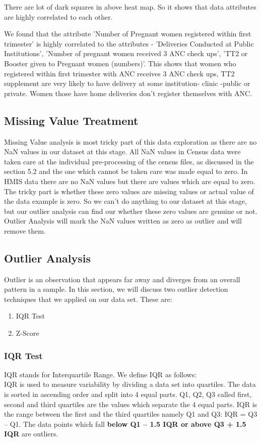 \documentclass[12pt]{article}
\begin{document}
There are lot of dark squares in above heat map. So it shows that data attributes are highly correlated to each other.

We found that the attribute 'Number of Pregnant women registered within first trimester' is highly correlated to the attributes - 'Deliveries Conducted at Public Institutions', 'Number of pregnant women received 3 ANC check ups', 'TT2 or Booster given to Pregnant women (numbers)'. This shows that women who registered within first trimester with ANC receives 3 ANC check ups, TT2 supplement are very likely to have delivery at some institution- clinic -public or private. Women those have home deliveries don't register themselves with ANC.

\subsection{Missing Value Treatment}

Missing Value analysis is most tricky part of this data exploration as there are no NaN values in our dataset at this stage. All NaN values in Census data were taken care at the individual pre-processing of the census files, as discussed in the section 5.2 and the one which cannot be taken care was made equal to zero. In HMIS data there are no NaN values but there are values which are equal to zero. \\

The tricky part is whether these zero values are missing values or actual value of the data example is zero. So we can't do anything to our dataset at this stage, but our outlier analysis can find our whether these zero values are genuine or not. Outlier Analysis will mark the NaN values written as zero as outlier and will remove them.

\subsection{Outlier Analysis}

Outlier is an observation that appears far away and diverges from an overall pattern in a sample. In this section, we will discuss two outlier detection techniques that we applied on our data set. These are:
\begin{enumerate}
	\item IQR Test
	\item Z-Score 
\end{enumerate}

\subsubsection{IQR Test}
IQR stands for Interquartile Range. We define IQR as follows:\\
IQR is used to measure variability by dividing a data set into quartiles. The data is sorted in ascending order and split into 4 equal parts. Q1, Q2, Q3 called first, second and third quartiles are the values which separate the 4 equal parts. IQR is the range between the first and the third quartiles namely Q1 and Q3: IQR = Q3 – Q1. The data points which fall\textbf{ below Q1 – 1.5 IQR or above Q3 + 1.5 IQR} are outliers. \\
\end{document}
